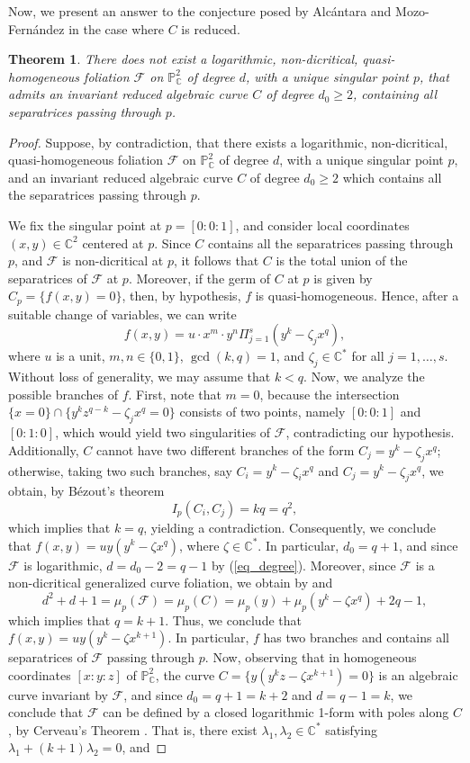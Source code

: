 \documentclass[11pt]{amsart}
\newcommand{\C}{\mathbb{C}}
\newcommand{\F}{\mathcal{F}}
\newtheorem{theorem}{Theorem}[section]
\begin{document}
Now, we present an answer to the conjecture posed by Alc\'antara and Mozo-Fern\'andez in the case where $C$ is reduced.
\begin{theorem}
There does not exist a logarithmic, non-dicritical, quasi-homogeneous foliation $\F$ on $\mathbb{P}^2_\C$ of degree $d$, with a unique singular point $p$, that admits an invariant reduced algebraic curve $C$ of degree $d_0\geq 2$, containing all separatrices passing through $p$. 
\end{theorem}
\begin{proof}
Suppose, by contradiction, that there exists a logarithmic, non-dicritical, quasi-homogeneous foliation $\F$ on $\mathbb{P}^2_\C$ of degree $d$, with a unique singular point $p$, and an invariant reduced algebraic curve $C$ of degree $d_0\geq 2$ which contains all the separatrices passing through $p$.
\par We fix the singular point at $p=[0:0:1]$, and consider local coordinates $(x,y)\in\C^2$ centered at $p$. Since $C$ contains all the separatrices passing through $p$, and $\F$ is non-dicritical at $p$, it follows that $C$ is the total union of the separatrices of $\F$ at $p$. Moreover, if the germ of $C$ at $p$ is given by $C_p=\{f(x,y)=0\}$, then, by hypothesis, $f$ is quasi-homogeneous.
Hence, after a suitable change of variables, we can write
\[f(x,y)=u\cdot x^{m}\cdot y^{n}\Pi_{j=1}^{s}(y^k-\zeta_{j} x^{q}),\]
where $u$ is a unit, $m,n\in\{0,1\}$, $\gcd(k,q)=1$, and $\zeta_j\in\C^{*}$ for all $j=1,\ldots,s$. 
Without loss of generality, we may assume that $k<q$. Now, we analyze the possible branches of $f$. 
First, note that $m=0$, because the intersection $\{x=0\}\cap \{ y^k z^{q-k}-\zeta_{j} x^{q}=0\}$ consists of two points, namely $[0:0:1]$ and $[0:1:0]$, which would yield two singularities of $\F$, contradicting our hypothesis. 
Additionally, $C$ cannot have two different branches of the form $C_j=y^k-\zeta_{j} x^{q}$; otherwise, taking two such branches, say $C_i=y^k-\zeta_{i} x^{q}$ and $C_j=y^k-\zeta_{j} x^{q}$, we obtain, by B\'ezout's theorem 
\[I_p(C_i,C_j)=kq=q^2,\] which implies that $k=q$, yielding a contradiction. Consequently, we conclude that $f(x,y)=uy(y^k-\zeta x^{q})$, where $\zeta\in\C^{*}$. In particular, $d_0=q+1$, and since $\F$ is logarithmic,
$d=d_0-2=q-1$ by (\ref{eq_degree}).  Moreover, since $\F$ is a non-dicritical generalized curve foliation, we obtain by \cite[p. 19]{Brunella-book} and \cite[Theorem 4]{CLS}
\[d^2+d+1=\mu_p(\F)=\mu_p(C)=\mu_p(y)+\mu_p(y^k-\zeta x^{q})+2q-1,\] which implies that $q=k+1$. Thus, we conclude that $f(x,y)=uy(y^{k}-\zeta x^{k+1})$. In particular, $f$ has two branches and contains all separatrices of $\F$ passing through $p$. Now, observing that in homogeneous coordinates $[x:y:z]$ of $\mathbb{P}^2_{\C}$, the curve $C=\{y(y^{k}z-\zeta x^{k+1})=0\}$ is an algebraic curve invariant by $\mathcal{F}$, and since $d_0=q+1=k+2$ and $d=q-1=k$, we conclude that $\mathcal{F}$ can be defined by a closed logarithmic 1-form with poles along $C$, by Cerveau's Theorem \cite[Theorem 1.4]{Cerveau}. That is, there exist $\lambda_1, \lambda_2 \in \C^{*}$ satisfying $\lambda_1 + (k+1)\lambda_2 = 0$, and

\end{proof}
\end{document}
